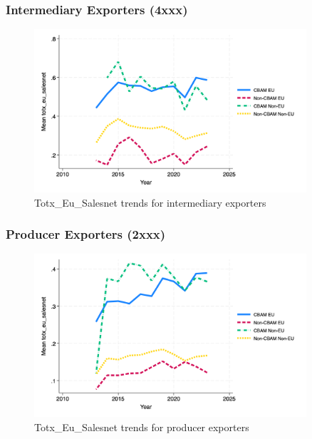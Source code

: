 \documentclass{article}
\begin{document}
\subsubsection{Intermediary Exporters (4xxx)}
\begin{figure}[h!]
\centering
\includegraphics[width=0.9\textwidth]{totx_eu_salesnet_ei.png}
\caption{Totx_Eu_Salesnet trends for intermediary exporters}
\label{fig:totx_eu_salesnet_ei}
\end{figure}

\subsubsection{Producer Exporters (2xxx)}
\begin{figure}[h!]
\centering
\includegraphics[width=0.9\textwidth]{totx_eu_salesnet_ep.png}
\caption{Totx_Eu_Salesnet trends for producer exporters}
\label{fig:totx_eu_salesnet_ep}
\end{figure}
\end{document}
